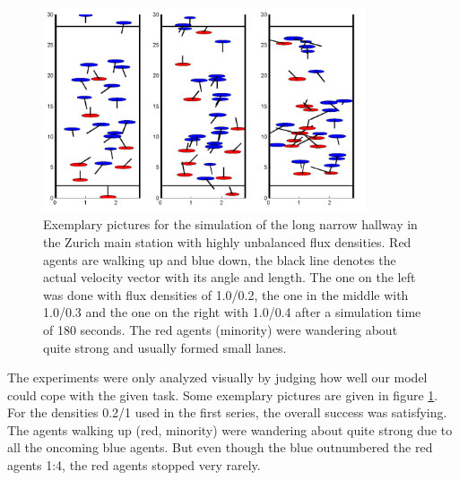
\begin{figure}[h!]
	\centering
		\includegraphics[width=0.85\textwidth]{pictures/ex6picture.png}
	\caption{Exemplary pictures for the simulation of the long narrow hallway in the Zurich main station with highly unbalanced flux densities. Red agents are walking up and blue down, the black line denotes the actual velocity vector with its angle and length. The one on the left was done with flux densities of 1.0/0.2, the one in the middle with 1.0/0.3 and the one on the right with 1.0/0.4 after a simulation time of 180 seconds. The red agents (minority) were wandering about quite strong and usually formed small lanes.}
	\label{fig:ex6picture}
\end{figure}

\noi The experiments were only analyzed visually by judging how well our model could cope with the given task. Some exemplary pictures are given in figure \ref{fig:ex6picture}.\\

\noi For the densities 0.2/1 used in the first series, the overall success was satisfying. The agents walking up (red, minority) were wandering about quite strong due to all the oncoming blue agents. But even though the blue outnumbered the red agents 1:4, the red agents stopped very rarely.\\

